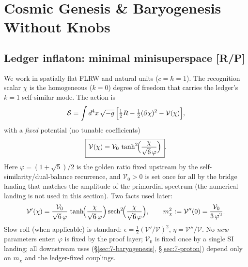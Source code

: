 \documentclass[11pt]{article}
\begin{document}

\section{Cosmic Genesis \& Baryogenesis Without Knobs}

\subsection{Ledger inflaton: minimal minisuperspace [R/P]}
We work in spatially flat FLRW and natural units ($c=\hbar=1$). The recognition scalar $\chi$ is the homogeneous ($k=0$) degree of freedom that carries the ledger’s $k{=}1$ self-similar mode. The action is
\[
  \mathcal S
  = \int d^{4}x\,\sqrt{-g}\,\Bigl[\tfrac12 R
      - \tfrac12(\partial\chi)^{2} - \mathcal V(\chi)\Bigr],
\]
with a \emph{fixed} potential (no tunable coefficients)
\[
  \boxed{\,\mathcal V(\chi)=\mathcal V_{0}\,\tanh^{2}\!\Bigl(\frac{\chi}{\sqrt6\,\varphi}\Bigr)\,}.
\]
Here $\varphi=(1+\sqrt5)/2$ is the golden ratio fixed upstream by the self-similarity/dual-balance recurrence, and $\mathcal V_{0}>0$ is set once for all by the bridge landing that matches the amplitude of the primordial spectrum (the numerical landing is not used in this section). Two facts used later:
\[
  \mathcal V'(\chi)=\frac{\mathcal V_{0}}{\sqrt6\,\varphi}\,\tanh\!\Bigl(\frac{\chi}{\sqrt6\,\varphi}\Bigr)
                    \operatorname{sech}^{2}\!\Bigl(\frac{\chi}{\sqrt6\,\varphi}\Bigr),\qquad
  m_{\chi}^{2} := \mathcal V''(0)=\frac{\mathcal V_{0}}{3\,\varphi^{2}}.
\]
Slow roll (when applicable) is standard: $\epsilon=\tfrac12(\mathcal V'/\mathcal V)^{2}$, $\eta=\mathcal V''/\mathcal V$. No \emph{new} parameters enter: $\varphi$ is fixed by the proof layer; $\mathcal V_{0}$ is fixed once by a single SI landing; all downstream uses (\S\ref{sec:7-baryogenesis}, \S\ref{sec:7-proton}) depend only on $m_{\chi}$ and the ledger-fixed couplings.
\end{document}
